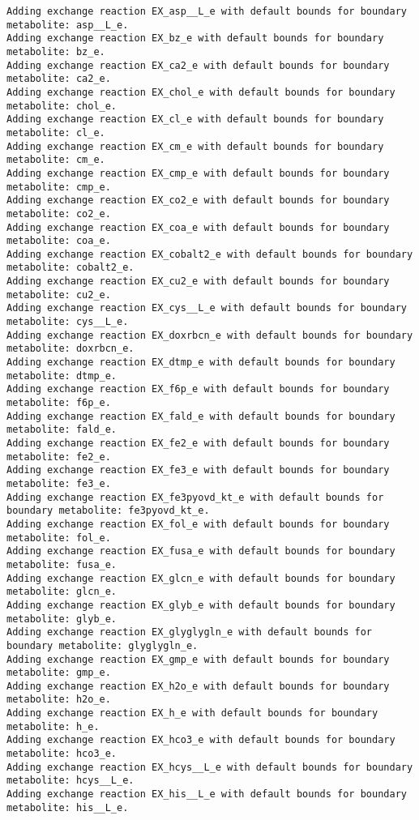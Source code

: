 \documentclass[
  letterpaper,
  DIV=11,
  numbers=noendperiod]{scrartcl}
\begin{document}
\begin{verbatim}
Adding exchange reaction EX_asp__L_e with default bounds for boundary metabolite: asp__L_e.
Adding exchange reaction EX_bz_e with default bounds for boundary metabolite: bz_e.
Adding exchange reaction EX_ca2_e with default bounds for boundary metabolite: ca2_e.
Adding exchange reaction EX_chol_e with default bounds for boundary metabolite: chol_e.
Adding exchange reaction EX_cl_e with default bounds for boundary metabolite: cl_e.
Adding exchange reaction EX_cm_e with default bounds for boundary metabolite: cm_e.
Adding exchange reaction EX_cmp_e with default bounds for boundary metabolite: cmp_e.
Adding exchange reaction EX_co2_e with default bounds for boundary metabolite: co2_e.
Adding exchange reaction EX_coa_e with default bounds for boundary metabolite: coa_e.
Adding exchange reaction EX_cobalt2_e with default bounds for boundary metabolite: cobalt2_e.
Adding exchange reaction EX_cu2_e with default bounds for boundary metabolite: cu2_e.
Adding exchange reaction EX_cys__L_e with default bounds for boundary metabolite: cys__L_e.
Adding exchange reaction EX_doxrbcn_e with default bounds for boundary metabolite: doxrbcn_e.
Adding exchange reaction EX_dtmp_e with default bounds for boundary metabolite: dtmp_e.
Adding exchange reaction EX_f6p_e with default bounds for boundary metabolite: f6p_e.
Adding exchange reaction EX_fald_e with default bounds for boundary metabolite: fald_e.
Adding exchange reaction EX_fe2_e with default bounds for boundary metabolite: fe2_e.
Adding exchange reaction EX_fe3_e with default bounds for boundary metabolite: fe3_e.
Adding exchange reaction EX_fe3pyovd_kt_e with default bounds for boundary metabolite: fe3pyovd_kt_e.
Adding exchange reaction EX_fol_e with default bounds for boundary metabolite: fol_e.
Adding exchange reaction EX_fusa_e with default bounds for boundary metabolite: fusa_e.
Adding exchange reaction EX_glcn_e with default bounds for boundary metabolite: glcn_e.
Adding exchange reaction EX_glyb_e with default bounds for boundary metabolite: glyb_e.
Adding exchange reaction EX_glyglygln_e with default bounds for boundary metabolite: glyglygln_e.
Adding exchange reaction EX_gmp_e with default bounds for boundary metabolite: gmp_e.
Adding exchange reaction EX_h2o_e with default bounds for boundary metabolite: h2o_e.
Adding exchange reaction EX_h_e with default bounds for boundary metabolite: h_e.
Adding exchange reaction EX_hco3_e with default bounds for boundary metabolite: hco3_e.
Adding exchange reaction EX_hcys__L_e with default bounds for boundary metabolite: hcys__L_e.
Adding exchange reaction EX_his__L_e with default bounds for boundary metabolite: his__L_e.

\end{verbatim}
\end{document}
